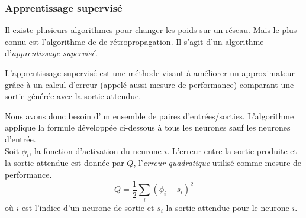 {\subsubsection{Apprentissage supervisé}\label{sec:appmlp}
Il existe plusieurs algorithmes pour changer les poids sur un réseau. Mais le plus connu est l'algorithme de de rétropropagation.\cite{Haykin,Gauthier}
Il s'agit d'un algorithme d'\emph{apprentissage supervisé}.
\begin{definition}
L'apprentissage supervisé est une méthode visant à améliorer un approximateur grâce à un calcul d'erreur (appelé aussi mesure de performance\cite{Gauthier}) comparant une sortie générée avec la sortie attendue.
\end{definition}
Nous avons donc besoin d'un ensemble de paires d'entrées/sorties.
L'algorithme applique la formule développée ci-dessous à tous les neurones sauf les neurones d'entrée.\\

Soit $\phi_i$, la fonction d'activation du neurone $i$. L'erreur entre la sortie produite et la sortie attendue est donnée par $Q$, l'\emph{erreur quadratique} utilisé comme mesure de performance.
\begin{equation} \label{eq:Q}
 Q = \frac{1}{2}\sum_{i}(\phi_i-s_i)^2
\end{equation}
où $i$ est l'indice d'un neurone de sortie et $s_i$ la sortie attendue pour le neurone $i$.

}
